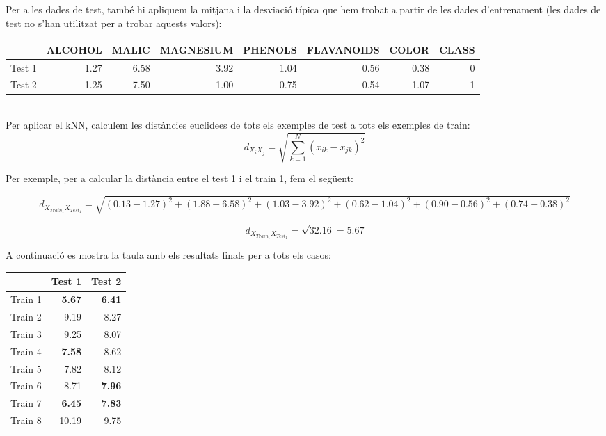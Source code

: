 \documentclass{article} %
\begin{document}
{	Per a les dades de test, també hi apliquem la mitjana i la desviació típica que hem trobat a partir de les dades d'entrenament (les dades de test no s'han utilitzat per a trobar aquests valors):\\

	{\selectfont\small
	\begin{tabular}{l | r r r r r r r}
	 	& ALCOHOL & MALIC & MAGNESIUM & PHENOLS & FLAVANOIDS & COLOR & CLASS \\ \hline
		Test 1 & 1.27 & 6.58 & 3.92 & 1.04 & 0.56 & 0.38 & 0 \\
		Test 2 & -1.25 & 7.50 & -1.00 & 0.75 & 0.54 & -1.07 & 1 \\
	\end{tabular}
	} \\

	Per aplicar el kNN, calculem les distàncies euclidees de tots els exemples de test a tots els exemples de train: \\

	\[d_{X_iX_j} = \sqrt{\sum\limits_{k=1}^N (x_{ik}-x_{jk})^2}\]

	Per exemple, per a calcular la distància entre el test 1 i el train 1, fem el següent:
	
	\begin{changemargin}{-2.5cm}{0.5cm}
		\[d_{X_{Train_1}X_{Test_1}} = \sqrt{(0.13-1.27)^2 + (1.88-6.58)^2 + (1.03-3.92)^2 + (0.62-1.04)^2 + (0.90-0.56)^2 + (0.74-0.38)^2}\]
	\end{changemargin}

	\[d_{X_{Train_1}X_{Test_1}} = \sqrt{32.16}=5.67\]

	A continuació es mostra la taula amb els resultats finals per a tots els casos:

	{\selectfont\small
	\begin{tabular}{r | r r}
		& Test 1 & Test 2 \\ \hline
		Train 1 & {\color{red} \textbf{5.67}} & {\color{red} \textbf{6.41}} \\
		Train 2 & 9.19 & 8.27 \\
		Train 3 & 9.25 & 8.07 \\
		Train 4 & {\color{olive} \textbf{7.58}} & 8.62 \\
		Train 5 & 7.82 & 8.12 \\
		Train 6 & 8.71 & {\color{olive} \textbf{7.96}} \\
		Train 7 & {\color{olive} \textbf{6.45}} & {\color{olive} \textbf{7.83}} \\
		Train 8 & 10.19 & 9.75 \\
	\end{tabular}
	} \\

}
\end{document}

